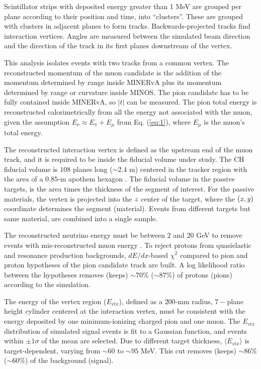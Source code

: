 \documentclass[aps,prl,twocolumn,superscriptaddress,nofootinbib]{revtex4-1}
\begin{document}
\par Scintillator strips with deposited energy greater than 1 MeV are grouped per plane according to their
position and time, into ``clusters''. These are grouped with clusters in adjacent planes to form tracks. 
Backwards-projected tracks find interaction vertices. Angles are measured between the simulated beam direction
and the direction of the track in its first planes downstream of the vertex.

\par This analysis isolates events with two tracks from a common vertex. The reconstructed momentum of the 
muon candidate is the addition of the momentum determined by range inside MINERvA plus its momentum determined
by range or curvature inside MINOS. The pion candidate has to be fully contained inside MINERvA, so 
$\lvert t\rvert$ can be measured. The pion total energy is reconstructed calorimetrically from all the energy not
associated with the muon, given the assumption $E_{\nu}\approx E_{\pi}+E_{\mu}$ from Eq. (\ref{eq:1}), where
$E_{\mu}$ is the muon's total energy. 

\par The reconstructed interaction vertex is defined as the upstream end of the muon track, and it is required
to be inside the fiducial volume under study. The CH fiducial volume is $108$ planes long (${\sim}2.4$ m)
centered in the tracker region with the area of a $0.85$-m apothem hexagon \cite{footnote1}. The fiducial volume
in the passive targets, is the area times the thickness of the segment of interest. For the passive materials, 
the vertex is projected into the $\it z$ center of the target, where the $\left(\it x, y\right)$ coordinate 
determines the segment (material). Events from different targets but same material, are combined into a single
sample.

\par The reconstructed neutrino energy must be between 2 and 20 GeV to remove events with mis-reconstructed 
muon energy \cite{MINERvA:2016iqn}. To reject protons from quasielastic and resonance production backgrounds, 
$dE/dx$-based $\chi^{2}$ compared to pion and proton hypotheses of the pion candidate track are built. A log 
likelihood ratio \cite{Neyman:1933wgr} between the hypotheses removes (keeps) ${\sim}70\%$ (${\sim}87\%$) of 
protons (pions) according to the simulation.

The energy of the vertex region ($E_{vtx}$), defined as a $200$-mm radius, $7-$plane height cylinder centered
at the interaction vertex, must be consistent with the energy deposited by one minimum-ionizing charged pion
and one muon. The $E_{vtx}$ distribution of simulated signal events is fit to a Gaussian function, and events
within $\pm1\sigma$ of the mean are selected. Due to different target thickness, $\langle E_{vtx}\rangle$ is 
target-dependent, varying from ${\sim}60$ to ${\sim}95$ MeV. This cut removes (keeps)  
${\sim}86\%$ (${\sim}60\%$) of the background (signal).
\end{document}
